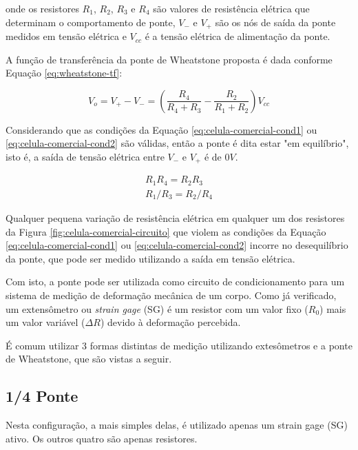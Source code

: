 \documentclass[a4paper]{instrumentacao}
\begin{document}
\noindent onde os resistores $R_1$, $R_2$, $R_3$ e $R_4$ são valores de resistência elétrica que determinam o comportamento de ponte, $V_-$ e $V_+$ são os nós de saída da ponte medidos em tensão elétrica e $V_{cc}$ é a tensão elétrica de alimentação da ponte.

A função de transferência da ponte de Wheatstone proposta é dada conforme Equação \ref{eq:wheatstone-tf}:

\begin{equation}
	V_o = V_+ - V_- = \left(\dfrac{R_4}{R_4 + R_3} - \dfrac{R_2}{R_1 + R_2}\right)V_{cc}
	\label{eq:wheatstone-tf}
\end{equation}

Considerando que as condições da Equação \ref{eq:celula-comercial-cond1} ou \ref{eq:celula-comercial-cond2} são válidas, então a ponte é dita estar "em equilíbrio", isto é, a saída de tensão elétrica entre $V_-$ e $V_+$ é de $0V$.

\begin{eqnarray}
	R_1 R_4 = R_2 R_3 \label{eq:celula-comercial-cond1} \\
	R_1/R_3 = R_2/R_4 \label{eq:celula-comercial-cond2}
\end{eqnarray} 

Qualquer pequena variação de resistência elétrica em qualquer um dos resistores da Figura \ref{fig:celula-comercial-circuito} que violem as condições da Equação \ref{eq:celula-comercial-cond1} ou \ref{eq:celula-comercial-cond2} incorre no desequilíbrio da ponte, que pode ser medido utilizando a saída em tensão elétrica.

Com isto, a ponte pode ser utilizada como circuito de condicionamento para um sistema de medição de deformação mecânica de um corpo. Como já verificado, um extensômetro ou \textit{strain gage} (SG) é um resistor com um valor fixo ($R_0$) mais um valor variável ($\Delta R$) devido à deformação percebida.


É comum utilizar 3 formas distintas de medição utilizando extesômetros e a ponte de Wheatstone, que são vistas a seguir.

\subsection{1/4 Ponte}

Nesta configuração, a mais simples delas, é utilizado apenas um strain gage (SG) ativo. Os outros quatro são apenas resistores.
\end{document}
